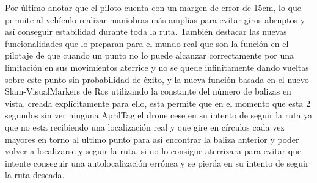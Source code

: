 \hspace{1cm} Por último anotar que el piloto cuenta con un margen de error de 15cm, lo que permite al vehículo realizar maniobras más amplias para evitar giros abruptos y así conseguir estabilidad durante toda la ruta. También destacar las nuevas funcionalidades que lo preparan para el mundo real que son la función en el pilotaje de que cuando un punto no lo puede alcanzar correctamente por una limitación en sus movimientos aterrice y no se quede infinitamente dando vueltas sobre este punto sin probabilidad de éxito, y la nueva función basada en el nuevo Slam-VisualMarkers de Ros utilizando la constante del número de balizas en vista, creada explícitamente para ello, esta permite que en el momento que esta 2 segundos sin ver ninguna AprilTag el drone cese en su intento de seguir la ruta ya que no esta recibiendo una localización real y que gire en círculos cada vez mayores en torno al ultimo punto para así encontrar la baliza anterior y poder volver a localizarse y seguir la ruta, si no lo consigue aterrizara para evitar que intente conseguir una autolocalización errónea y se pierda en su intento de seguir la ruta deseada.
